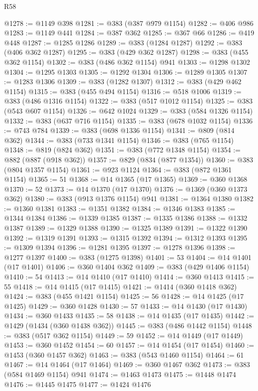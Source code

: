\begin{lexlean}{R58}
\begin{coremodule}
@1278 := @1149 @398
@1281 := @383 (@387 @979 @1154)
@1282 := @406 @986
@1283 := @1149 @441
@1284 := @387 @362
@1285 := @367 @66
@1286 := @419 @448
@1287 := @1285 @1286
@1289 := @383 (@1284 @1287)
@1292 := @383 (@406 @362 @1287)
@1295 := @383 (@429 @362 @1287)
@1298 := @383 (@455 @362 @1154)
@1302 := @383 (@486 @362 @1154) @941
@1303 := @1298 @1302
@1304 := @1295 @1303
@1305 := @1292 @1304
@1306 := @1289 @1305
@1307 := @1283 @1306
@1309 := @383 (@1282 @1307)
@1312 := @383 (@429 @462 @1154)
@1315 := @383 (@455 @494 @1154)
@1316 := @518 @1006
@1319 := @383 (@486 @1316 @1154)
@1322 := @383 (@517 @1012 @1154)
@1325 := @383 (@543 @607 @1154)
@1326 := @642 @1024
@1329 := @383 (@584 @1326 @1154)
@1332 := @383 (@637 @716 @1154)
@1335 := @383 (@678 @1032 @1154)
@1336 := @743 @784
@1339 := @383 (@698 @1336 @1154)
@1341 := @809 (@814 @362)
@1344 := @383 (@733 @1341 @1154)
@1346 := @383 (@765 @1154)
@1348 := @819 (@824 @362)
@1351 := @383 (@772 @1348 @1154)
@1354 := @882 (@887 (@918 @362))
@1357 := @829 (@834 (@877 @1354))
@1360 := @383 (@804 @1357 @1154)
@1361 := @923 @1124
@1364 := @383 (@872 @1361 @1154)
@1365 := 51
@1368 := @14 @1365 (@17 @1365)
@1369 := @360 @1368
@1370 := 52
@1373 := @14 @1370 (@17 @1370)
@1376 := @1369 (@360 @1373 @362)
@1380 := @383 (@913 @1376 @1154) @941
@1381 := @1364 @1380
@1382 := @1360 @1381
@1383 := @1351 @1382
@1384 := @1346 @1383
@1385 := @1344 @1384
@1386 := @1339 @1385
@1387 := @1335 @1386
@1388 := @1332 @1387
@1389 := @1329 @1388
@1390 := @1325 @1389
@1391 := @1322 @1390
@1392 := @1319 @1391
@1393 := @1315 @1392
@1394 := @1312 @1393
@1395 := @1309 @1394
@1396 := @1281 @1395
@1397 := @1278 @1396
@1398 := @1277 @1397
@1400 := @383 (@1275 @1398)
@1401 := 53
@1404 := @14 @1401 (@17 @1401)
@1406 := @360 @1404 @362
@1409 := @383 (@429 @1406 @1154)
@1410 := 54
@1413 := @14 @1410 (@17 @1410)
@1414 := @360 @1413
@1415 := 55
@1418 := @14 @1415 (@17 @1415)
@1421 := @1414 (@360 @1418 @362)
@1424 := @383 (@455 @1421 @1154)
@1425 := 56
@1428 := @14 @1425 (@17 @1425)
@1429 := @360 @1428
@1430 := 57
@1433 := @14 @1430 (@17 @1430)
@1434 := @360 @1433
@1435 := 58
@1438 := @14 @1435 (@17 @1435)
@1442 := @1429 (@1434 (@360 @1438 @362))
@1445 := @383 (@486 @1442 @1154)
@1448 := @383 (@517 @362 @1154)
@1449 := 59
@1452 := @14 @1449 (@17 @1449)
@1453 := @360 @1452
@1454 := 60
@1457 := @14 @1454 (@17 @1454)
@1460 := @1453 (@360 @1457 @362)
@1463 := @383 (@543 @1460 @1154)
@1464 := 61
@1467 := @14 @1464 (@17 @1464)
@1469 := @360 @1467 @362
@1473 := @383 (@584 @1469 @1154) @941
@1474 := @1463 @1473
@1475 := @1448 @1474
@1476 := @1445 @1475
@1477 := @1424 @1476

\end{coremodule}
\end{lexlean}

